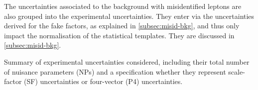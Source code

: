 The uncertainties associated to the background with misidentified leptons are also grouped into the experimental uncertainties. They enter via the uncertainties derived for the fake factors, as explained in \cref{subsec:misid-bkg}, and thus only impact the normalisation of the statistical templates. They are discussed in \cref{subsec:misid-bkg}.
\begin{table}[ht]
    \begin{center}
        
    \end{center}
    \caption{Summary of experimental uncertainties considered, including their total number of nuisance parameters (NPs) and a specification whether they represent scale-factor (SF) uncertainties or four-vector (P4) uncertainties.
    }
    \label{tab:exp-uncertainties}
\end{table}



